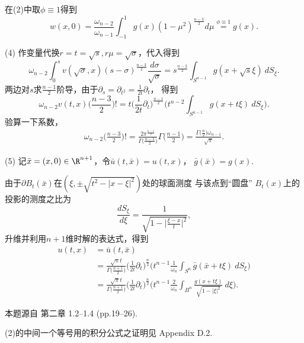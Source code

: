 \begin{itemize}
    在(2)中取$\phi\equiv1$得到
    $$w(x,0)=\frac{\omega_{n-2}}{\omega_{n-1}}\int_{-1}^1 g(x)(1-\mu^2)^\frac{n-3}{2}d\mu\overset{\phi\equiv1}{=}g(x).$$

    (4) 作变量代换$r=t=\sqrt{s},r\mu=\sqrt{\sigma}$，代入得到
    $$\omega_{n-2}\int_0^s v(\sqrt{\sigma},x)(s-\sigma)^\frac{n-3}{2}\frac{d\sigma}{\sqrt{\sigma}}
    =s^\frac{n-2}{2}\int_{S^{n-1}}g(x+\sqrt{s}\xi)\>dS_\xi.$$
    两边对$s$求$\frac{n-1}{2}$阶导，由于$\partial_s=\partial_{t^2}=\frac{1}{2t}\partial_t$，
    得到
    $$\omega_{n-2}v(t,x)\big({\textstyle \frac{n-3}{2}}\big)!
    =t\Big(\frac{1}{2t}\partial_t\Big)^\frac{n-1}{2}\bigg(t^{n-2}\int_{S^{n-1}}g(x+t\xi)\>dS_\xi\bigg).$$
    验算一下系数，
    \begin{align*}
        \omega_{n-2}\big(\tfrac{n-3}{2}\big)!
        =\frac{2\pi^\frac{n-1}{2}}{\varGamma\big(\frac{n-1}{2}\big)}\varGamma\big(\tfrac{n-1}{2}\big)
        =\frac{\varGamma\big(\frac{n}{2}\big)\omega_{n-1}}{\sqrt{\pi}}.
    \end{align*}

    (5) 记$\bar{x}=(x,0)\in\R^{n+1}$，令$\bar{u}(t,\bar{x})=u(t,x)$，
    $\bar{g}(\bar{x})=g(x)$.

    由于$\partial B_t(\bar{x})$在$(\xi,\pm\sqrt{t^2-|x-\xi|^2})$处的球面测度
    与该点到“圆盘” $B_t(x)$上的投影的测度之比为
    $$\frac{dS_\xi}{d\xi}=\frac{1}{\sqrt{1-\big|\frac{\xi-x}{t}\big|^2}},$$
    升维并利用$n+1$维时解的表达式，得到
    \begin{align*}
        u(t,x)&=\bar{u}(t,\bar{x})\\
        &=\frac{\sqrt{\pi}t}{\varGamma\big(\frac{n+1}{2}\big)}
        \Big(\frac{1}{2t}\partial_t\Big)^\frac{n}{2}
        \bigg(t^{n-1}\frac{1}{\omega_n}\int_{S^n}\bar{g}(\bar{x}+t\xi)\>dS_\xi\bigg)\\
        &=\frac{\sqrt{\pi}t}{\varGamma\big(\frac{n+1}{2}\big)}
        \Big(\frac{1}{2t}\partial_t\Big)^\frac{n}{2}
        \bigg(t^{n-1}\frac{2}{\omega_n}\int_{B^n}\frac{g(x+t\xi)}{\sqrt{1-|\xi|^2}}\>d\xi\bigg).
    \end{align*}
    \begin{remark*}
    本题源自\cite{LZ} 第二章 1.2--1.4 (pp.19--26).

    (2)的中间一个等号用的积分公式之证明见\cite{Gr} Appendix D.2.


\end{remark*}
\end{itemize}
